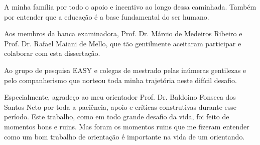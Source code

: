 \vspace{2.17cm}

\begin{center}
\end{center}{}

\vspace{1.6cm}



A minha família por todo o apoio e incentivo ao longo dessa caminhada. Também por entender que a educação é a base fundamental do ser humano.

Aos membros da banca examinadora, Prof. Dr. Márcio de Medeiros Ribeiro e
Prof. Dr. Rafael Maiani de Mello, que tão gentilmente aceitaram participar e
colaborar com esta dissertação. 

Ao grupo de pesquisa EASY e colegas de mestrado pelas inúmeras gentilezas e pelo companherismo que norteou toda minha trajetória neste difícil desafio. 

Especialmente, agradeço ao meu orientador Prof. Dr. Baldoino Fonseca dos Santos Neto por toda a paciência, apoio e críticas construtivas durante esse período. Este trabalho, como em todo grande desafio da vida, foi feito de momentos bons e ruins. Mas foram os momentos ruins que me fizeram entender como um bom trabalho de orientação é importante na vida de um orientando.



